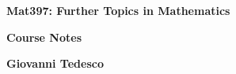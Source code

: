 \documentclass[a4paper]{article}
\begin{document}
  \begin{titlepage}
   \begin{center}
       \vspace*{1cm}
       {\huge
       \textbf{Mat397: Further Topics in Mathematics}}\

       \vspace{1.5cm}

       {\large
       \textbf{Course Notes}}

       \vspace{0.8cm}
       \textbf{Giovanni Tedesco}
       \vspace{0.8cm}
   \end{center}
  \end{titlepage}
  \tableofcontents
  \newpage

  
  \newpage
  
  \newpage
  
  \newpage
  
  \newpage
  \appendix
  
  

  
\end{document}
